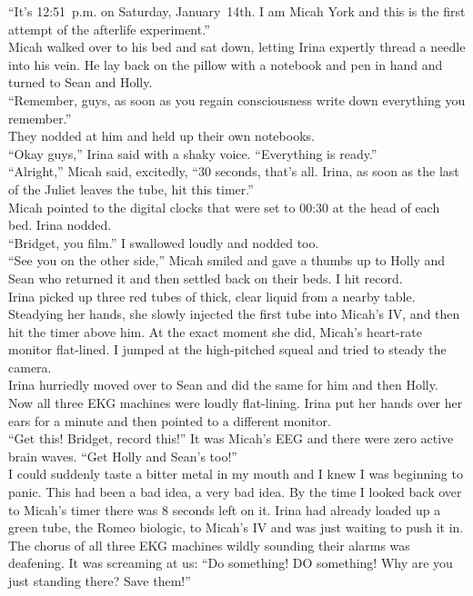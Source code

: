 \documentclass[a5paper]{scrartcl}
\begin{document}
“It's 12:51~p.m. on Saturday, January~14th. I am Micah York and this is the first attempt of the afterlife experiment.”\\
Micah walked over to his bed and sat down, letting Irina expertly thread a needle into his vein. He lay back on the pillow with a notebook and pen in hand and turned to Sean and Holly.\\
\enquote{Remember, guys, as soon as you regain consciousness write down everything you remember.}\\
They nodded at him and held up their own notebooks.\\
\enquote{Okay guys,} Irina said with a shaky voice. \enquote{Everything is ready.}\\
\enquote{Alright,} Micah said, excitedly, \enquote{30 seconds, that's all. Irina, as soon as the last of the Juliet leaves the tube, hit this timer.}\\
Micah pointed to the digital clocks that were set to 00:30 at the head of each bed. Irina nodded.\\
\enquote{Bridget, you film.} I swallowed loudly and nodded too.\\
\enquote{See you on the other side,} Micah smiled and gave a thumbs up to Holly and Sean who returned it and then settled back on their beds. I hit record.\\
Irina picked up three red tubes of thick, clear liquid from a nearby table. Steadying her hands, she slowly injected the first tube into Micah's IV, and then hit the timer above him. At the exact moment she did, Micah's heart-rate monitor flat-lined. I jumped at the high-pitched squeal and tried to steady the camera.\\
Irina hurriedly moved over to Sean and did the same for him and then Holly. Now all three EKG machines were loudly flat-lining. Irina put her hands over her ears for a minute and then pointed to a different monitor.\\
\enquote{Get this! Bridget, record this!} It was Micah's EEG and there were zero active brain waves. \enquote{Get Holly and Sean's too!}\\
I could suddenly taste a bitter metal in my mouth and I knew I was beginning to panic. This had been a bad idea, a very bad idea. By the time I looked back over to Micah's timer there was 8 seconds left on it. Irina had already loaded up a green tube, the Romeo biologic, to Micah's IV and was just waiting to push it in.\\
The chorus of all three EKG machines wildly sounding their alarms was deafening. It was screaming at us: \enquote{Do something! DO something! Why are you just standing there? Save them!}\\
\end{document}
